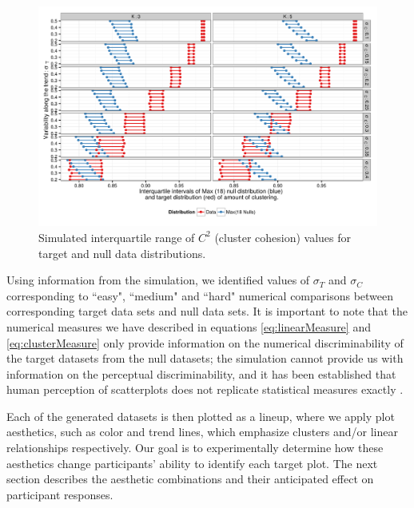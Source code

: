 \documentclass[11pt]{isuthesis}\usepackage[]{graphicx}\usepackage[]{color}
\newenvironment{knitrout}{}{} %
\begin{document}
\begin{figure}[ht]\centering
\begin{knitrout}
\color{fgcolor}

{\centering \includegraphics[width=.8\linewidth]{Figure/FeatureHierarchy/fig-simulationparameters-cluster-1} 

}



\end{knitrout}
\caption[Simulated IQR of $C^2$ cluster cohesion values]{Simulated interquartile range of $C^2$ (cluster cohesion) values for target and null data distributions. \label{fig:simulationClusterIntervals}}
\end{figure}

Using information from the simulation, we identified values of $\sigma_T$ and $\sigma_C$ corresponding to ``easy", ``medium" and ``hard" numerical comparisons between corresponding target data sets and null data sets. It is important to note that the numerical measures we have described in equations \eqref{eq:linearMeasure} and \eqref{eq:clusterMeasure} only provide information on the numerical discriminability of the target datasets from the null datasets; the simulation cannot provide us with information on the perceptual discriminability, and it has been established that human perception of scatterplots does not replicate statistical measures exactly \citep{bobko1979perception, mosteller1981eye, lewandowsky1989perception}.

Each of the generated datasets is then plotted as a lineup, where we apply plot aesthetics, such as color and trend lines, which emphasize clusters and/or linear relationships respectively. Our goal is to experimentally determine how these aesthetics change participants' ability to identify each target plot. The next section describes the aesthetic combinations and their anticipated effect on participant responses. 
\end{document}
